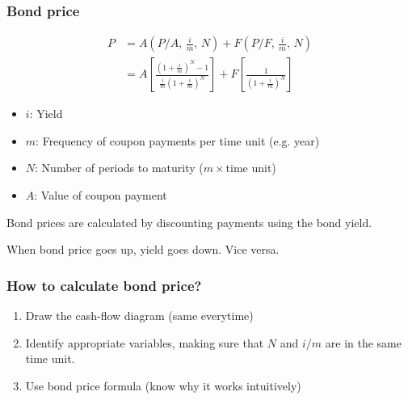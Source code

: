 \subsubsection{Bond price}
\begin{definition}
    \begin{equation}
        \begin{aligned}
            P &= A \left(P/A, \, \frac{i}{m}, \, N\right) + F \left(P/F, \, \frac{i}{m}, \, N\right) \\
            &= A \left[\frac{(1 + \frac{i}{m})^{N} - 1}{\frac{i}{m} (1 + \frac{i}{m})^{N}}\right] + F \left[\frac{1}{(1 + \frac{i}{m})^{N}}\right]
        \end{aligned}
    \end{equation}

    \begin{itemize}
        \item $i$: Yield
        \item $m$: Frequency of coupon payments per time unit (e.g. year)
        \item $N$: Number of periods to maturity ($m \times \text{time unit}$)
        \item $A$: Value of coupon payment
    \end{itemize}
\end{definition}

\begin{intuition}
    Bond prices are calculated by discounting payments using the bond yield.
\end{intuition}

\begin{warning}
    When bond price goes up, yield goes down. Vice versa.
\end{warning}

\subsubsection{How to calculate bond price?}
\begin{process}
    \begin{enumerate}
        \item Draw the cash-flow diagram (same everytime)
        \item Identify appropriate variables, making sure that $N$ and $i/m$ are in the same time unit.
        \item Use bond price formula (know why it works intuitively)
    \end{enumerate}
\end{process}

